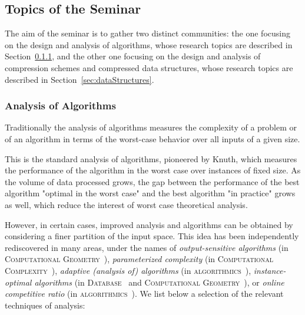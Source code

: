 \documentclass[a4paper,10pt]{article}
\begin{document}

\subsection{Topics of the Seminar}
\label{sec:topics-seminar}

The aim of the seminar is to gather two distinct communities: the one focusing on the design and analysis of algorithms, whose research topics are described in Section~\ref{sec:algorithms}, and the other one focusing on the design and analysis of compression schemes and compressed data structures, whose research topics are described in Section~\ref{sec:dataStructures}.

\subsubsection{Analysis of Algorithms}
\label{sec:algorithms}

Traditionally the analysis of algorithms measures the complexity of a problem or of an algorithm in terms of the worst-case behavior over all inputs of a given size. \begin{LONG} This is the standard analysis of algorithms, pioneered by Knuth\cite{1968-BOOK-TheArtOfComputerProgramming-Knuth}, which measures the performance of the algorithm in the worst case over instances of fixed size. As the volume of data processed grows, the gap between the performance of the best algorithm "optimal in the worst case" and the best algorithm "in practice" grows as well, which reduce the interest of worst case theoretical analysis.

\end{LONG}
However, in certain cases, improved analysis and algorithms can be obtained by considering a finer partition of the input space.  This idea has been independently rediscovered in many areas, under the names of \emph{output-sensitive algorithms} (in \textsc{Computational Geometry}~\cite{1985-SOCG-OutputSizeSensitiveAlgorithmsForFindingMaximalVectors-KirkpatrickSeidel,1986-JCom-TheUltimatePlanarConvexHullAlgorithm-KirkpatrickSeidel}), \emph{parameterized complexity} (in \textsc{Computational Complexity}~\cite{CyganFKLMPPS15}), \emph{adaptive (analysis of) algorithms} (in \textsc{algorithmics}~\cite{1992-ACJ-AnOverviewOfAdaptiveSorting-MoffatPetersson}), \emph{instance-optimal algorithms} (in \textsc{Database}~\cite{2003-JCSS-OptimalAggregationAlgorithmsForMiddleWare-FaginLotemNaor} and \textsc{Computational Geometry}~\cite{2017-JACM-InstanceOptimalGeometricAlgorithms-AfshaniBarbayChan}), or \emph{online competitive ratio} (in \textsc{algorithmics}~\cite{2007-SODA-OnTheSeparationAndEquivalenceOfPagingStrategies-AngelopoulosDorrigivLopezOrtiz}). 
%
We list below a selection of the relevant techniques of analysis:
\end{document}
